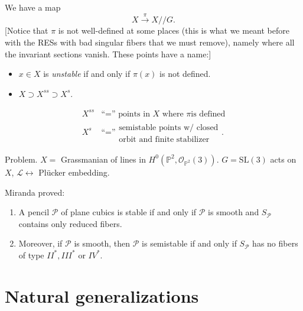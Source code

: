 \noindent
We have a map
$$
X \xrightarrow{\pi}X//G.
$$
[Notice that $\pi$ is not well-defined
at some places (this
is what we meant before with
the RESs with bad singular fibers
that we must remove),
namely where all the invariant sections
vanish. These points have a name:]

\begin{itemize}
\item $x \in X$ is {\it unstable} if and only
if
$\pi(x)$ is not defined.
\item  $X \supset X^{ss} \supset X^s$.
\end{itemize}

$$
\begin{aligned}
X^{ss}&\text{``='' points in $X$ where $\pi$
is defined}\\
X^s &  \text{``=''}\substack{
\text{semistable points w/ closed} \\
\text{orbit and finite stabilizer}}.
\end{aligned}
$$


\medskip\noindent
Problem. $X=$ Grassmanian of lines
in
$H^0(\mathbb{P}^2,\mathcal{O}_{\mathbb{P}^2}
(3))$.
$G=\text{SL}(3)$ acts on $X$,
$\mathcal{L} \leftrightarrow $
Plücker embedding.

\medskip\noindent
Miranda proved:
\begin{enumerate}
\item A pencil $\mathcal{P}$ of plane cubics
is stable
if and only if $\mathcal{P}$ is smooth
and $S_{\mathcal{P}}$ contains only
reduced fibers.

\item Moreover, if $\mathcal{P}$ is smooth,
then $\mathcal{P}$ is semistable if and only
if
$S_{\mathcal{P}}$ has no fibers of type
$II^*, III^*$ or $IV^*$.
\end{enumerate}



\section{Natural generalizations}
\label{section-natural-generalizations}

